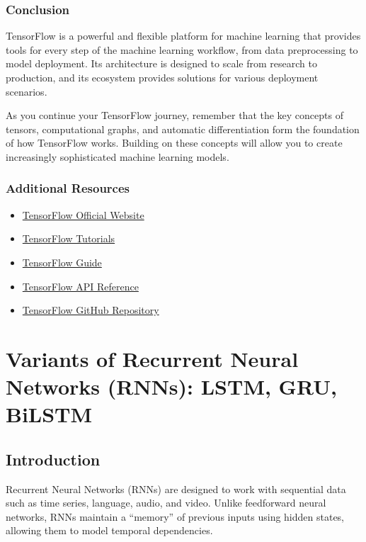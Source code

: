 \documentclass[
  letterpaper,
  DIV=11,
  numbers=noendperiod]{scrreprt}
\providecommand{\tightlist}{%
  \setlength{\itemsep}{0pt}\setlength{\parskip}{0pt}}\usepackage{longtable,booktabs,array}
\begin{document}
\subsection{Conclusion}\label{conclusion-7}

TensorFlow is a powerful and flexible platform for machine learning that
provides tools for every step of the machine learning workflow, from
data preprocessing to model deployment. Its architecture is designed to
scale from research to production, and its ecosystem provides solutions
for various deployment scenarios.

As you continue your TensorFlow journey, remember that the key concepts
of tensors, computational graphs, and automatic differentiation form the
foundation of how TensorFlow works. Building on these concepts will
allow you to create increasingly sophisticated machine learning models.

\subsection{Additional Resources}\label{additional-resources}

\begin{itemize}
\tightlist
\item
  \href{https://www.tensorflow.org/}{TensorFlow Official Website}
\item
  \href{https://www.tensorflow.org/tutorials}{TensorFlow Tutorials}
\item
  \href{https://www.tensorflow.org/guide}{TensorFlow Guide}
\item
  \href{https://www.tensorflow.org/api_docs}{TensorFlow API Reference}
\item
  \href{https://github.com/tensorflow/tensorflow}{TensorFlow GitHub
  Repository}
\end{itemize}


\chapter{Variants of Recurrent Neural Networks (RNNs): LSTM, GRU,
BiLSTM}\label{variants-of-recurrent-neural-networks-rnns-lstm-gru-bilstm}

\section{Introduction}\label{introduction-3}

Recurrent Neural Networks (RNNs) are designed to work with sequential
data such as time series, language, audio, and video. Unlike feedforward
neural networks, RNNs maintain a ``memory'' of previous inputs using
hidden states, allowing them to model temporal dependencies.
\end{document}
